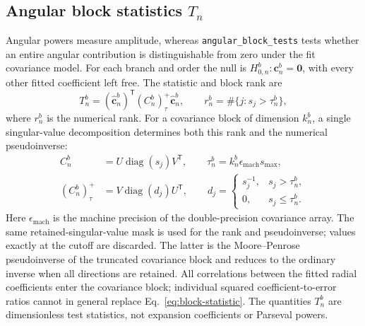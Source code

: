 \documentclass[aps,prb,preprint,onecolumn,notitlepage,amsmath,amssymb,
  superscriptaddress,floatfix]{revtex4-2}
\newcommand{\trans}{\mathsf{T}}
\begin{document}
\subsection{Angular block statistics \texorpdfstring{$T_n$}{Tn}}

Angular powers measure amplitude, whereas \texttt{angular\_block\_tests}
tests whether an entire angular contribution is distinguishable from zero
under the fit covariance model. For each branch and order the null is
$H_{0,n}^b:\bm c_n^b=\bm0$, with every other fitted coefficient left free.
The statistic and block rank are
\begin{equation}
 T_n^b=(\widehat{\bm c}_n^b)^{\trans}(C_n^b)^+_{\tau}
             \widehat{\bm c}_n^b,\qquad
 r_n^b=\#\{j:s_j>\tau_n^b\},
 \label{eq:block-statistic}
\end{equation}
where $r_n^b$ is the numerical rank. For a covariance block of dimension
$k_n^b$, a single singular-value decomposition determines both this rank
and the numerical pseudoinverse:
\begin{align*}
 C_n^b&=U\operatorname{diag}(s_j)V^{\trans},\qquad
 \tau_n^b=k_n^b\epsilon_{\mathrm{mach}}s_{\max},\\
 (C_n^b)^+_{\tau}&=V\operatorname{diag}(d_j)U^{\trans},\qquad
 d_j=\begin{cases}
 s_j^{-1},&s_j>\tau_n^b,\\
 0,&s_j\leq\tau_n^b.
 \end{cases}
\end{align*}
Here $\epsilon_{\mathrm{mach}}$ is the machine precision of the
double-precision covariance array. The same retained-singular-value mask
is used for the rank and pseudoinverse; values exactly at the cutoff are
discarded. The latter is the Moore--Penrose pseudoinverse of the truncated
covariance block and reduces to the ordinary inverse when all directions
are retained. All correlations between the fitted radial coefficients
enter the covariance block; individual squared coefficient-to-error
ratios cannot in general replace Eq.~\eqref{eq:block-statistic}. The
quantities $T_n^b$ are dimensionless test statistics, not expansion
coefficients or Parseval powers.
\end{document}
